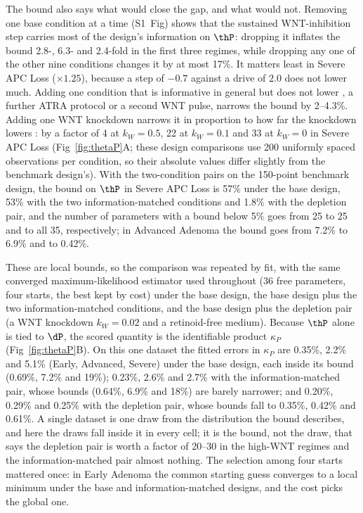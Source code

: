 The bound also says what would close the gap, and what would not. Removing one
base condition at a time (S1~Fig) shows that the sustained WNT-inhibition step
carries most of the design's information on $\thP$: dropping it inflates the
bound 2.8-, 6.3- and 2.4-fold in the first three regimes, while dropping any
one of the other nine conditions changes it by at most 17\%. It matters least in
Severe APC Loss ($\times1.25$), because a step of $-0.7$ against a drive of $2.0$ does not lower
\bcat{} much. Adding one condition that is informative in general but does not
lower \bcat{}, a further ATRA protocol or a second WNT pulse, narrows the bound
by 2--4.3\%. Adding one WNT knockdown narrows it in proportion to how far the
knockdown lowers \bcat{}: by a factor of 4 at $k_W=0.5$, 22 at $k_W=0.1$ and 33
at $k_W=0$ in Severe APC Loss (Fig~\ref{fig:thetaP}A; these design comparisons
use 200 uniformly spaced observations per condition, so their absolute values
differ slightly from the benchmark design's). With the two-condition pairs on the
150-point benchmark design, the bound on $\thP$ in Severe APC Loss is 57\% under
the base design, 53\% with the two information-matched conditions and 1.8\% with
the depletion pair, and the number of parameters with a bound below 5\% goes from
25 to 25 and to all 35, respectively; in Advanced Adenoma the bound goes from
7.2\% to 6.9\% and to 0.42\%.

These are local bounds, so the comparison was repeated by fit, with the same
converged maximum-likelihood estimator used throughout (36 free parameters, four
starts, the best kept by cost) under the base design, the base design plus the
two information-matched conditions, and the base design plus the depletion pair
(a WNT knockdown $k_W=0.02$ and a retinoid-free medium). Because $\thP$ alone is
tied to $\dP$, the scored quantity is the identifiable product $\kappa_P$
(Fig~\ref{fig:thetaP}B). On this one dataset the fitted errors in $\kappa_P$ are
0.35\%, 2.2\% and 5.1\% (Early, Advanced, Severe) under the base design, each
inside its bound (0.69\%, 7.2\% and 19\%); 0.23\%, 2.6\% and 2.7\% with the
information-matched pair, whose bounds (0.64\%, 6.9\% and 18\%) are barely
narrower; and 0.20\%, 0.29\% and 0.25\% with the depletion pair, whose bounds
fall to 0.35\%, 0.42\% and 0.61\%. A single dataset is one draw from the
distribution the bound describes, and here the draws fall inside it in every
cell; it is the bound, not the draw, that says the depletion pair is worth a
factor of 20--30 in the high-WNT regimes and the information-matched pair almost
nothing. The selection among four starts mattered once: in Early Adenoma the
common starting guess converges to a local minimum under the base and
information-matched designs, and the cost picks the global one.

